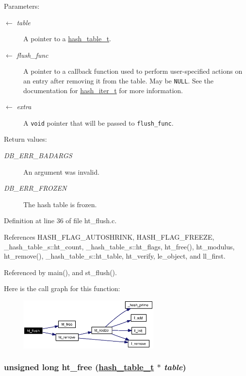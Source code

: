 \begin{Desc}
\item[Parameters:]
\begin{description}
\item[\mbox{$\leftarrow$} {\em table}]A pointer to a \hyperlink{group__dbprim__hash_ga1}{hash\_\-table\_\-t}. \item[\mbox{$\leftarrow$} {\em flush\_\-func}]A pointer to a callback function used to perform user-specified actions on an entry after removing it from the table. May be {\tt NULL}. See the documentation for \hyperlink{group__dbprim__hash_ga3}{hash\_\-iter\_\-t} for more information. \item[\mbox{$\leftarrow$} {\em extra}]A {\tt void} pointer that will be passed to {\tt flush\_\-func}.\end{description}
\end{Desc}
\begin{Desc}
\item[Return values:]
\begin{description}
\item[{\em DB\_\-ERR\_\-BADARGS}]An argument was invalid. \item[{\em DB\_\-ERR\_\-FROZEN}]The hash table is frozen.\end{description}
\end{Desc}


Definition at line 36 of file ht\_\-flush.c.

References HASH\_\-FLAG\_\-AUTOSHRINK, HASH\_\-FLAG\_\-FREEZE, \_\-hash\_\-table\_\-s::ht\_\-count, \_\-hash\_\-table\_\-s::ht\_\-flags, ht\_\-free(), ht\_\-modulus, ht\_\-remove(), \_\-hash\_\-table\_\-s::ht\_\-table, ht\_\-verify, le\_\-object, and ll\_\-first.

Referenced by main(), and st\_\-flush().

Here is the call graph for this function:\begin{figure}[H]
\begin{center}
\leavevmode
\includegraphics[width=201pt]{group__dbprim__hash_ga15_cgraph}
\end{center}
\end{figure}
\hypertarget{group__dbprim__hash_ga17}{
\subsubsection[ht\_\-free]{\setlength{\rightskip}{0pt plus 5cm}unsigned long ht\_\-free (\hyperlink{struct__hash__table__s}{hash\_\-table\_\-t} $\ast$ {\em table})}}
\label{group__dbprim__hash_ga17}


